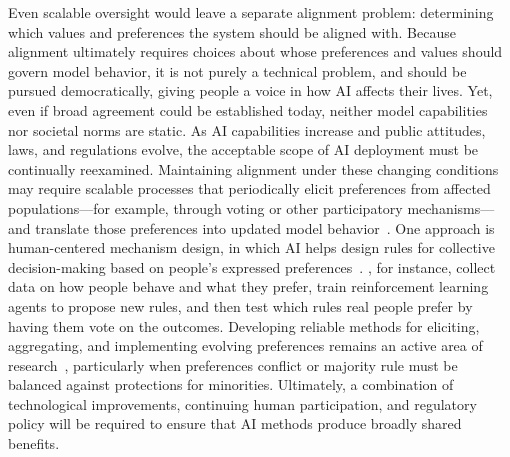 \documentclass[10pt]{article}
\def\citep#1{}%
\def\citet#1{}%
\begin{document}
Even scalable oversight would leave a separate alignment problem: determining which values and preferences the system should be aligned with.
Because alignment ultimately requires choices about whose preferences and values should govern model behavior, it is not purely a technical problem, and should be pursued democratically, giving people a voice in how AI affects their lives. 
Yet, even if broad agreement could be established today, neither model capabilities nor societal norms are static. 
As AI capabilities increase and public attitudes, laws, and regulations evolve, the acceptable scope of AI deployment must be continually reexamined. 
Maintaining alignment under these changing conditions may require scalable processes that periodically elicit preferences from affected populations---for example, through voting or other participatory mechanisms---and translate those preferences into updated model behavior~\citep{bowman2022measuring, leike2018scalable, hadfieldmenell2024cooperativeinversereinforcementlearning}. 
One approach is human-centered mechanism design, in which AI helps design rules for collective decision-making based on people's expressed preferences~\citep{leytonbrown2008gametheory}. 
\citet{Koster2022mechanism}, for instance, collect data on how people behave and what they prefer, train reinforcement learning agents to propose new rules, and then test which rules real people prefer by having them vote on the outcomes.
Developing reliable methods for eliciting, aggregating, and implementing evolving preferences remains an active area of research~\citep{ji2025aialignmentcomprehensivesurvey, Gabriel2020values, sun2024easy}, particularly when preferences conflict or majority rule must be balanced against protections for minorities. 
Ultimately, a combination of technological improvements, continuing human participation, and regulatory policy will be required to ensure that AI methods produce broadly shared benefits.
\end{document}
